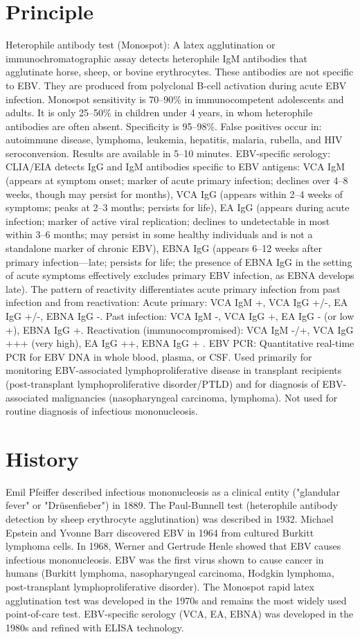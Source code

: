 \section*{Principle}
Heterophile antibody test (Monospot): A latex agglutination or immunochromatographic assay detects heterophile IgM antibodies that agglutinate horse, sheep, or bovine erythrocytes. These antibodies are not specific to EBV. They are produced from polyclonal B-cell activation during acute EBV infection. Monospot sensitivity is 70--90\% in immunocompetent adolescents and adults. It is only 25--50\% in children under 4 years, in whom heterophile antibodies are often absent. Specificity is 95--98\%. False positives occur in: autoimmune disease, lymphoma, leukemia, hepatitis, malaria, rubella, and HIV seroconversion. Results are available in 5--10 minutes. EBV-specific serology: CLIA/EIA detects IgG and IgM antibodies specific to EBV antigens: VCA IgM (appears at symptom onset; marker of acute primary infection; declines over 4--8 weeks, though may persist for months), VCA IgG (appears within 2--4 weeks of symptoms; peaks at 2--3 months; persists for life), EA IgG (appears during acute infection; marker of active viral replication; declines to undetectable in most within 3--6 months; may persist in some healthy individuals and is not a standalone marker of chronic EBV), EBNA IgG (appears 6--12 weeks after primary infection---late; persists for life; the presence of EBNA IgG in the setting of acute symptoms effectively excludes primary EBV infection, as EBNA develops late). The pattern of reactivity differentiates acute primary infection from past infection and from reactivation: Acute primary: VCA IgM +, VCA IgG +/-, EA IgG +/-, EBNA IgG -. Past infection: VCA IgM -, VCA IgG +, EA IgG - (or low +), EBNA IgG +. Reactivation (immunocompromised): VCA IgM -/+, VCA IgG +++ (very high), EA IgG ++, EBNA IgG + \cite{klutts2009evidence}. EBV PCR: Quantitative real-time PCR for EBV DNA in whole blood, plasma, or CSF. Used primarily for monitoring EBV-associated lymphoproliferative disease in transplant recipients (post-transplant lymphoproliferative disorder/PTLD) and for diagnosis of EBV-associated malignancies (nasopharyngeal carcinoma, lymphoma). Not used for routine diagnosis of infectious mononucleosis.

\section*{History}
Emil Pfeiffer described infectious mononucleosis as a clinical entity ("glandular fever" or "Drüsenfieber") in 1889. The Paul-Bunnell test (heterophile antibody detection by sheep erythrocyte agglutination) was described in 1932. Michael Epstein and Yvonne Barr discovered EBV in 1964 from cultured Burkitt lymphoma cells. In 1968, Werner and Gertrude Henle showed that EBV causes infectious mononucleosis. EBV was the first virus shown to cause cancer in humans (Burkitt lymphoma, nasopharyngeal carcinoma, Hodgkin lymphoma, post-transplant lymphoproliferative disorder). The Monospot rapid latex agglutination test was developed in the 1970s and remains the most widely used point-of-care test. EBV-specific serology (VCA, EA, EBNA) was developed in the 1980s and refined with ELISA technology.


